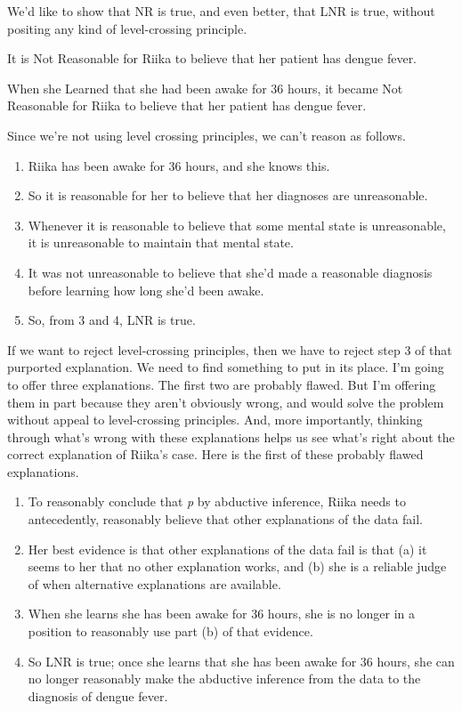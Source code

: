 \documentclass[
  10pt,
  letterpaper,
  twoside]{scrbook}
\providecommand{\tightlist}{%
  \setlength{\itemsep}{0pt}\setlength{\parskip}{0pt}}\usepackage{longtable,booktabs,array}
\begin{document}
We'd like to show that NR is true, and even better, that LNR is true,
without positing any kind of level-crossing principle.

\begin{description}
\tightlist
\item[NR]
It is Not Reasonable for {Riika} to believe that her patient has dengue
fever.
\item[LNR]
When she Learned that she had been awake for 36 hours, it became Not
Reasonable for {Riika} to believe that her patient has dengue fever.
\end{description}

Since we're not using level crossing principles, we can't reason as
follows.

\begin{enumerate}
\def\labelenumi{\arabic{enumi}.}
\tightlist
\item
  {Riika} has been awake for 36 hours, and she knows this.
\item
  So it is reasonable for her to believe that her diagnoses are
  unreasonable.
\item
  Whenever it is reasonable to believe that some mental state is
  unreasonable, it is unreasonable to maintain that mental state.
\item
  It was not unreasonable to believe that she'd made a reasonable
  diagnosis before learning how long she'd been awake.
\item
  So, from 3 and 4, LNR is true.
\end{enumerate}

If we want to reject level-crossing principles, then we have to reject
step 3 of that purported explanation. We need to find something to put
in its place. I'm going to offer three explanations. The first two are
probably flawed. But I'm offering them in part because they aren't
obviously wrong, and would solve the problem without appeal to
level-crossing principles. And, more importantly, thinking through
what's wrong with these explanations helps us see what's right about the
correct explanation of {Riika}'s case. Here is the first of these
probably flawed explanations.

\begin{enumerate}
\def\labelenumi{\arabic{enumi}.}
\tightlist
\item
  To reasonably conclude that \emph{p} by abductive inference, {Riika}
  needs to antecedently, reasonably believe that other explanations of
  the data fail.
\item
  Her best evidence is that other explanations of the data fail is that
  (a) it seems to her that no other explanation works, and (b) she is a
  reliable judge of when alternative explanations are available.
\item
  When she learns she has been awake for 36 hours, she is no longer in a
  position to reasonably use part (b) of that evidence.
\item
  So LNR is true; once she learns that she has been awake for 36 hours,
  she can no longer reasonably make the abductive inference from the
  data to the diagnosis of dengue fever.
\end{enumerate}
\end{document}
